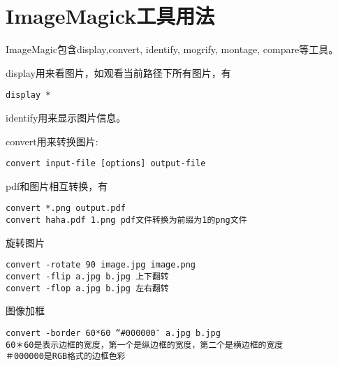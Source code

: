 \section{ImageMagick工具用法}
ImageMagic包含display,convert, identify, mogrify, montage, compare等工具。
\label{sec:imagemagick}

display用来看图片，如观看当前路径下所有图片，有
\begin{verbatim}
display *
\end{verbatim}

identify用来显示图片信息。

convert用来转换图片:
\begin{verbatim}
convert input-file [options] output-file
\end{verbatim}

pdf和图片相互转换，有
\begin{verbatim}
convert *.png output.pdf
convert haha.pdf 1.png pdf文件转换为前缀为1的png文件
\end{verbatim}

旋转图片
\begin{verbatim}
convert -rotate 90 image.jpg image.png
convert -flip a.jpg b.jpg 上下翻转
convert -flop a.jpg b.jpg 左右翻转
\end{verbatim}

图像加框
\begin{verbatim}
convert -border 60*60 “#000000″ a.jpg b.jpg
60＊60是表示边框的宽度，第一个是纵边框的宽度，第二个是横边框的宽度
＃000000是RGB格式的边框色彩
\end{verbatim}



